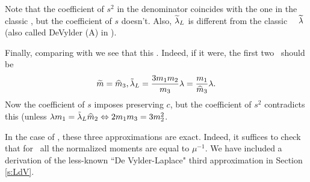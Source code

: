    Note that the coefficient of $s^2$ in the denominator coincides with the one in the  classic \deV, but the coefficient of $s$ doesn't. Also, $\widetilde {\lambda}_L$  is different from the classic \deV\ \para\  $\widetilde {\lambda}$ (also called DeVylder (A)   in
    \cite[(5.2-5.4)]{GSS}).

Finally, comparing with  we see that this .
    Indeed, if it were, the first two \paras\ should  be
    $$\widetilde m= \widehat m_3, {\tilde{\lambda}}_L=\frac{3 m_1 m_2}{m_3} \lambda=\frac{ m_1 }{\widehat m_3} \lambda. $$ Now the coefficient of $s$ imposes preserving $c$, but the coefficient of $s^2$ contradicts this (unless  $\lambda m_1 =  \tilde{\lambda}_L  {\widehat m_2} \Leftrightarrow 2 m_1 m_3 = 3 m_2^2$.



\EEN
\eeP
\beR  In the case of \expoc,  these three  approximations are exact.
 Indeed, it suffices to check that for \expoc \ all the normalized moments are equal to $\mu^{-1}$. \eeR
 We have included a derivation of the less-known ``De Vylder-Laplace" third approximation in Section \ref{s:LdV}.
